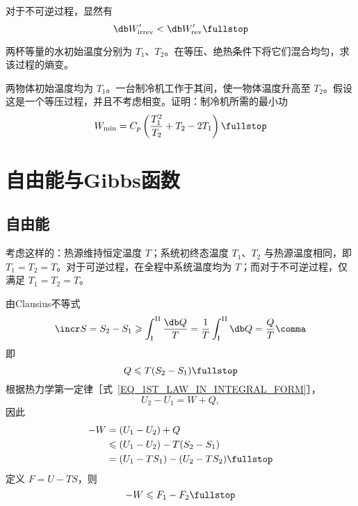     对于不可逆过程，显然有
    \begin{equation}
      \db W'_{\text{irrev}} < \db W'_{\text{rev}} \fullstop
    \end{equation}
    
    \begin{myExample}[水的混合]
      两杯等量的水初始温度分别为 $T_1$、$T_2$。在等压、绝热条件下将它们混合均匀，求该过程的熵变。%
    \end{myExample}
    
    \begin{myExample}[制冷机所需的最小功]
      两物体初始温度均为 $T_1$。一台制冷机工作于其间，使一物体温度升高至 $T_2$。假设这是一个等压过程，并且不考虑相变。证明：制冷机所需的最小功
      \begin{equation}
        W_{\text{min}} = C_p \left( \frac{T_1^2}{T_2} + T_2 - 2 T_1 \right) \fullstop%
      \end{equation}
    \end{myExample}
  
\section{自由能与Gibbs函数}
  \subsection{自由能}
    考虑这样的：热源维持恒定温度 $T$；系统初终态温度 $T_1$、$T_2$ 与热源温度相同，即 $T_1 = T_2 =T$。对于可逆过程，在全程中系统温度均为 $T$；而对于不可逆过程，仅满足 $T_1 = T_2 =T$。
    
    由Clausius不等式%
    \begin{equation}
      \incr S = S_2 - S_1 \geqslant \int_{\text{I}}^{\text{II}} \frac{\db Q}{T} = \frac{1}{T} \int_{\text{I}}^{\text{II}} \db Q = \frac{Q}{T}\comma 
    \end{equation}
    即
    \begin{equation}
      Q \leqslant T (S_2 - S_1) \fullstop
    \end{equation}
    根据热力学第一定律［式~\eqref{EQ_1ST_LAW_IN_INTEGRAL_FORM}］，
    \begin{equation}
      U_2 - U_1 = W + Q \comma
    \end{equation}
    因此
    \begin{align}
      -W &= (U_1 - U_2) + Q \notag \\
      &\leqslant (U_1 - U_2) - T (S_2 - S_1) \notag \\
      &=(U_1 - T S_1) - (U_2 - T S_2) \fullstop
    \end{align}
    定义 $F = U - T S$，则
    \begin{equation}
      -W \leqslant F_1 - F_2 \fullstop
    \end{equation}
    
